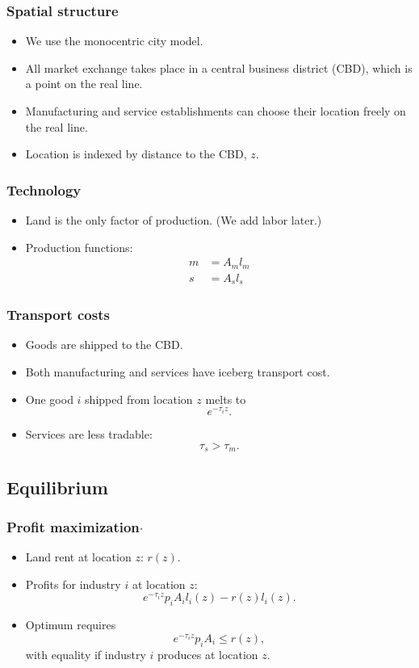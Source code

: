 \documentclass[compress,mathserif]{beamer}
\newcounter{perc}
\newcounter{percek}
\renewcommand{\time}[1]{\addtocounter{percek}{#1}}
\begin{document}
\begin{frame}\frametitle{Spatial structure}
\begin{itemize}
    \item We use the monocentric city model.
    \item All market exchange takes place in a central business district (CBD), which is a point on the real line.
    \item Manufacturing and service establishments can choose their location freely on the real line.
    \item Location is indexed by distance to the CBD, $z$.
\end{itemize}
\end{frame}

\time{2}

\begin{frame}\frametitle{Technology}
\begin{itemize}
    \item Land is the only factor of production. (We add labor later.)
    \item Production functions:
\begin{align*}
m&=A_ml_m\\
s&=A_sl_s
\end{align*}
\end{itemize}
\end{frame}

\time{1}

\begin{frame}\frametitle{Transport costs}
\begin{itemize}
    \item Goods are shipped to the CBD.
    \item Both manufacturing and services have iceberg transport cost.
    \item One good $i$ shipped from location $z$ melts to
    \[
    {e}^{-\tau_iz}.
    \]
    \item Services are less tradable:
    \[
    \tau_s>\tau_m.
    \]
\end{itemize}
\end{frame}
\time{2}

\subsection{Equilibrium}

\begin{frame}\frametitle{Profit maximization$\cdot$}
\begin{itemize}
    \item Land rent at location $z$: $r(z)$.
    \item Profits for industry $i$ at location $z$:
    \[
    {e}^{-\tau_i z} p_i A_i l_i(z) - r(z)l_i(z).
    \]
    \item Optimum requires
    \[
    {e}^{-\tau_i z} p_i A_i \le r(z),
    \]
    with equality if industry $i$ produces at location $z$.
\end{itemize}
\end{frame}
\time{1}
\end{document}

